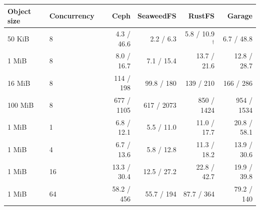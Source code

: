 \begin{tabular}{llrrrr}
\toprule
Object size & Concurrency & Ceph & SeaweedFS & RustFS & Garage \\
\midrule
50 KiB & 8 & 4.3 / 46.6 & 2.2 / 6.3 & 5.8 / 10.9$^{\dagger}$ & 6.7 / 48.8 \\
1 MiB & 8 & 8.0 / 16.7 & 7.1 / 15.4 & 13.7 / 21.6 & 12.8 / 28.7 \\
16 MiB & 8 & 114 / 198 & 99.8 / 180 & 139 / 210 & 166 / 286 \\
100 MiB & 8 & 677 / 1105 & 617 / 2073 & 850 / 1424 & 954 / 1534 \\
\midrule
1 MiB & 1 & 6.8 / 12.1 & 5.5 / 11.0 & 11.0 / 17.7 & 20.8 / 58.1 \\
1 MiB & 4 & 6.7 / 13.6 & 5.8 / 12.8 & 11.3 / 18.2 & 13.9 / 30.6 \\
1 MiB & 16 & 13.3 / 30.4 & 12.5 / 27.2 & 22.8 / 42.7 & 19.9 / 39.8 \\
1 MiB & 64 & 58.2 / 456 & 55.7 / 194 & 87.7 / 364 & 79.2 / 140 \\
\bottomrule
\end{tabular}
